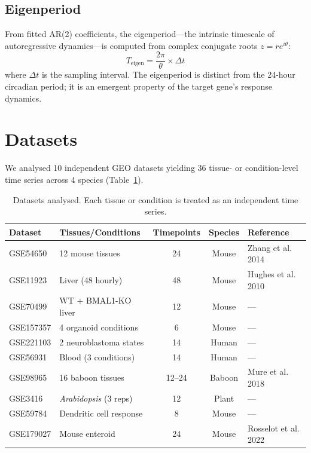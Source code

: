 \documentclass[11pt,letterpaper]{article}
\begin{document}
\subsection{Eigenperiod}

From fitted AR(2) coefficients, the eigenperiod---the intrinsic timescale of autoregressive dynamics---is computed from complex conjugate roots $z = re^{i\theta}$:
\begin{equation}
T_{\text{eigen}} = \frac{2\pi}{\theta} \times \Delta t
\end{equation}
where $\Delta t$ is the sampling interval. The eigenperiod is distinct from the 24-hour circadian period; it is an emergent property of the target gene's response dynamics.



\section{Datasets}
\label{sec:data}

We analysed 10 independent GEO datasets yielding 36 tissue- or condition-level time series across 4 species (Table~\ref{tab:datasets}).

\begin{table}[H]
\centering
\caption{Datasets analysed. Each tissue or condition is treated as an independent time series.}
\label{tab:datasets}
\begin{tabular}{llccl}
\toprule
\textbf{Dataset} & \textbf{Tissues/Conditions} & \textbf{Timepoints} & \textbf{Species} & \textbf{Reference} \\
\midrule
GSE54650 & 12 mouse tissues & 24 & Mouse & Zhang et al. 2014 \\
GSE11923 & Liver (48 hourly) & 48 & Mouse & Hughes et al. 2010 \\
GSE70499 & WT + BMAL1-KO liver & 12 & Mouse & --- \\
GSE157357 & 4 organoid conditions & 6 & Mouse & --- \\
GSE221103 & 2 neuroblastoma states & 14 & Human & --- \\
GSE56931 & Blood (3 conditions) & 14 & Human & --- \\
GSE98965 & 16 baboon tissues & 12--24 & Baboon & Mure et al. 2018 \\
GSE3416 & \textit{Arabidopsis} (3 reps) & 12 & Plant & --- \\
GSE59784 & Dendritic cell response & 8 & Mouse & --- \\
GSE179027 & Mouse enteroid & 24 & Mouse & Rosselot et al. 2022 \\
\bottomrule
\end{tabular}
\end{table}
\end{document}
